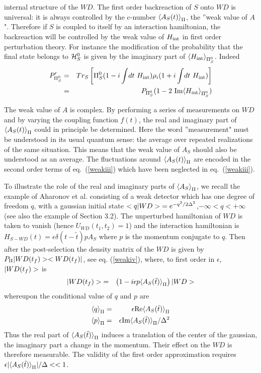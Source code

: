 internal structure of the $WD$. The first order backreaction of $S$
onto $WD$ is
universal: it is always controlled by the c-number $\mbox{$ \langle A_{S}(t) \rangle $}_{\Pi}$,
the ''weak
value of $A$". Therefore
if $S$ is coupled to itself by an
interaction hamiltonian, the backreaction
will be controlled by the
weak value of $H_{\rm int}$
in first order perturbation theory.
For instance the modification of the probability that the
final state belongs to ${\cal H}_S^{0}$ is
given by the imaginary part
of $\mbox{$ \langle H_{\rm int} \rangle $}_{\Pi_S^{0}}$.
Indeed
\begin{eqnarray}
P_{\Pi_S^0}^\prime &=& Tr_S \left[
\Pi_S^0 ( 1 - i \int\! dt\  H_{\rm int} )
\rho_i ( 1 + i \int\! dt\  H_{\rm int} )\right]\nonumber\\
&=&P_{\Pi_S^0} (1 - 2 { \mbox{ Im} \mbox{$ \langle H_{\rm int} \rangle $}_{\Pi_S^{0}}})
\end{eqnarray}


The weak value of $A$ is complex. By  performing a
series of
measurements on $WD$
and by varying the coupling function $f(t)$, the real and imaginary part of
$\mbox{$ \langle A_{S}(t) \rangle $}_{\Pi}$
 could in principle be determined. Here the word ''measurement"
must be understood in its usual quantum sense: the average over repeated
realizations of the same situation. This means that the weak value of $A_S$
should also be understood as an average. The fluctuations around
$\mbox{$ \langle A_{S}(t) \rangle $}_{\Pi}$
are encoded in the second order terms of eq.~(\ref{weakiii}) which have been
neglected in eq.~(\ref{weakiii}).

To illustrate the role of the real and imaginary parts of $\mbox{$ \langle A_{S} \rangle $}_{\Pi}$,
we
recall the example of Aharonov et al. consisting of a  weak
detector which has one degree of freedom $q$,
 with a gaussian initial state
$\mbox{$ < q \vert WD > $}=e^{-q^2/
2\Delta^2}$,$-\infty < q < + \infty$ (see also the example of Section 3.2).
 The unperturbed hamiltonian of $WD$ is taken to vanish
(hence $U_{WD}(t_1,t_2) = 1$)
 and the interaction hamiltonian is  $H_{S-WD} (t) =\epsilon
\delta(t-\tilde t) p A_S$ where $p$ is the momentum conjugate to $q$. Then
after the post-selection the density matrix
of the $WD$ is given by $P_{\Pi} \mbox{$ \vert WD(t_f) > $}\mbox{$ < WD(t_f) \vert $}$,
see eq. (\ref{weakiv}),
  where, to
first order in $\epsilon$, $\mbox{$ \vert WD(t_f) > $}$ is
\begin{eqnarray}
\mbox{$ \vert WD(t_f) > $} &=&\left(1-i\epsilon p\mbox{$ \langle A_{S}(\tilde t) \rangle $}_{\Pi} \right)
\mbox{$ \vert WD > $}
 \end{eqnarray}
whereupon the conditional value of $q$ and $p$ are
\begin{eqnarray}
\mbox{$ \langle q \rangle $}_{\Pi}&=& \epsilon \mbox{Re} \mbox{$ \langle A_{S}(\tilde t) \rangle $}_{\Pi}\nonumber\\
\mbox{$ \langle p \rangle $}_{\Pi}&=& \epsilon \mbox{Im} \mbox{$ \langle A_{S}(\tilde t) \rangle $}_{\Pi}/\Delta^2
 \label{weakviii}
 \end{eqnarray}
 Thus the real part of $\mbox{$ \langle A_{S}(\tilde t) \rangle $}_{\Pi} $ induces a
translation of the center of the gaussian, the imaginary part
a change in the
momentum. Their effect on the $WD$ is therefore measurable.
The validity of the first order approximation requires
$\mbox{$ \epsilon $} |\mbox{$ \langle A_{S}(\tilde t) \rangle $}_{\Pi} | / \Delta <<1$.


